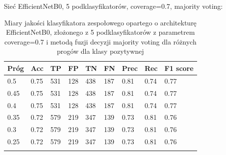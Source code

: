 \documentclass[polish,12pt]{aghthesis}
\begin{document}
\vspace{3.5mm}
\par\noindent Sieć EfficientNetB0, 5 podklasyfikatorów, coverage=0.7, majority voting:
 \begin{longtable}[h!]{|m{2.0cm}|m{1.2cm}|m{1.2cm}|m{1.2cm}|m{1.2cm}|m{1.2cm}|m{1.2cm}|m{1.2cm}|m{1.6cm}|}
 \hline
 Próg & Acc & TP & FP & TN & FN & Prec & Rec & F1 score\\
 \hline
 0.5 & 0.75 & 531 & 128 & 438 & 187 & 0.81 & 0.74 & 0.77\\
 \hline
 0.45 & 0.75 & 531 & 128 & 438 & 187 & 0.81 & 0.74 & 0.77\\
 \hline
 0.4 & 0.75 & 531 & 128 & 438 & 187 & 0.81 & 0.74 & 0.77\\
 \hline
 0.35 & 0.72 & 579 & 219 & 347 & 139 & 0.73 & 0.81 & 0.76\\
 \hline
 0.3 & 0.72 & 579 & 219 & 347 & 139 & 0.73 & 0.81 & 0.76\\
 \hline
 0.25 & 0.72 & 579 & 219 & 347 & 139 & 0.73 & 0.81 & 0.76\\
 \hline
\caption{Miary jakości klasyfikatora zespołowego opartego o architekturę EfficientNetB0, złożonego z 5 podklasyfikatorów z parametrem coverage=0.7 i metodą fuzji decyzji majority voting dla różnych progów dla klasy pozytywnej}
\label{table:41}
\end{longtable}
\end{document}
